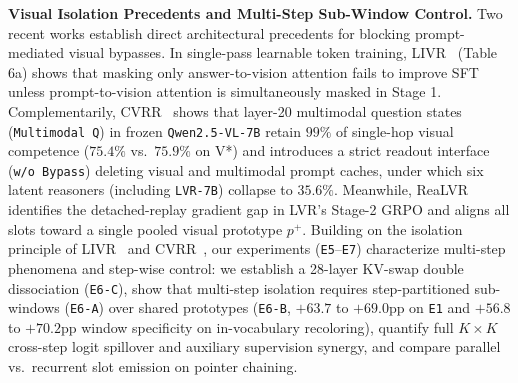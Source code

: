 \textbf{Visual Isolation Precedents and Multi-Step Sub-Window Control.} Two recent works establish direct architectural precedents for blocking prompt-mediated visual bypasses. In single-pass learnable token training, LIVR~\cite{li2026livr} (Table 6a) shows that masking only answer-to-vision attention fails to improve SFT unless prompt-to-vision attention is simultaneously masked in Stage 1. Complementarily, CVRR~\cite{park2026cvrr} shows that layer-20 multimodal question states (\texttt{Multimodal Q}) in frozen \texttt{Qwen2.5-VL-7B} retain $99\%$ of single-hop visual competence ($75.4\%$ vs.\ $75.9\%$ on V*) and introduces a strict readout interface (\texttt{w/o Bypass}) deleting visual and multimodal prompt caches, under which six latent reasoners (including \texttt{LVR-7B}) collapse to $35.6\%$. Meanwhile, ReaLVR~\cite{realvr2026} identifies the detached-replay gradient gap in LVR's Stage-2 GRPO and aligns all slots toward a single pooled visual prototype $p^+$. Building on the isolation principle of LIVR~\cite{li2026livr} and CVRR~\cite{park2026cvrr}, our experiments (\texttt{E5}--\texttt{E7}) characterize multi-step phenomena and step-wise control: we establish a 28-layer KV-swap double dissociation (\texttt{E6-C}), show that multi-step isolation requires step-partitioned sub-windows (\texttt{E6-A}) over shared prototypes (\texttt{E6-B}, $+63.7$ to $+69.0$pp on \texttt{E1} and $+56.8$ to $+70.2$pp window specificity on in-vocabulary recoloring), quantify full $K\times K$ cross-step logit spillover and auxiliary supervision synergy, and compare parallel vs.\ recurrent slot emission on pointer chaining.
